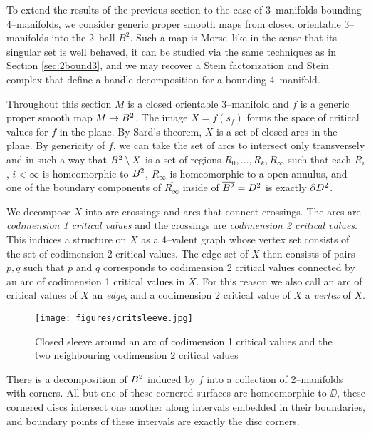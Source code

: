 \label{sec:3bound4}

To extend the results of the previous section to the case of 3--manifolds bounding 4--manifolds, we consider generic proper smooth maps from closed orientable 3--manifolds into the 2--ball $B^2$.
Such a map is Morse--like in the sense that its singular set is well behaved, it can be studied via the same techniques as in Section \ref{sec:2bound3}, and we may recover a Stein factorization and Stein complex that define a handle decomposition for a bounding 4--manifold.

Throughout this section $M$ is a closed orientable 3--manifold and $f$ is a generic proper smooth map $M\to B^2$.
The image $X=f(s_f)$ forms the space of critical values for $f$ in the plane.
By Sard's theorem, $X$ is a set of closed arcs in the plane.
By genericity of $f$, we can take the set of arcs to intersect only transversely and in such a way that $B^2\setminus X$ is a set of regions $R_0,\dots,R_k,R_\infty$ such that each $R_i$, $i<\infty$ is homeomorphic to $B^2$, $R_\infty$ is homeomorphic to a open annulus, and one of the boundary components of $\overline{R_\infty}$ inside of $\overline{B^2}=D^2$ is exactly $\partial D^2$.

We decompose $X$ into arc crossings and arcs that connect crossings.
The arcs are \emph{codimension 1 critical values} and the crossings are \emph{codimension 2 critical values}.
This induces a structure on $X$ as a 4--valent graph whose vertex set consists of the set of codimension 2 critical values.
The edge set of $X$ then consists of pairs $p,q$ such that $p$ and $q$ corresponds to codimension 2 critical values connected by an arc of codimension 1 critical values in $X$.
For this reason we also call an arc of critical values of $X$ an \emph{edge}, and a codimension 2 critical value of $X$ a \emph{vertex} of $X$.


\begin{figure}
	\centering
	\captionsetup{justification=centering}
	\caption{Closed sleeve around an arc of codimension 1 critical values and the two neighbouring codimension 2 critical values}
	\texttt{[image: figures/critsleeve.jpg]}
	\label{fig:critsleeve}
\end{figure}

\begin{lem}
	\label{lem:bbdecomp}
	There is a decomposition of $B^2$ induced by $f$ into a collection of 2--manifolds with corners. All but one of these cornered surfaces are homeomorphic to $\DD$, these cornered discs intersect one another along intervals embedded in their boundaries, and boundary points of these intervals are exactly the disc corners.
\end{lem}

